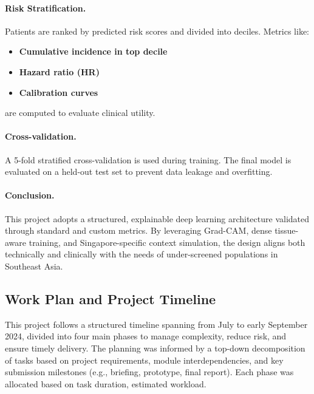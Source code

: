\documentclass[12pt]{article}
\begin{document}
\paragraph{Risk Stratification.}
Patients are ranked by predicted risk scores and divided into deciles. Metrics like:
\begin{itemize}
    \item \textbf{Cumulative incidence in top decile}
    \item \textbf{Hazard ratio (HR)}
    \item \textbf{Calibration curves}
\end{itemize}
are computed to evaluate clinical utility.

\paragraph{Cross-validation.}
A 5-fold stratified cross-validation is used during training. The final model is evaluated on a held-out test set to prevent data leakage and overfitting.

\vspace{1em}

\paragraph{Conclusion.}
This project adopts a structured, explainable deep learning architecture validated through standard and custom metrics. By leveraging Grad-CAM, dense tissue-aware training, and Singapore-specific context simulation, the design aligns both technically and clinically with the needs of under-screened populations in Southeast Asia.

\subsection{Work Plan and Project Timeline}

This project follows a structured timeline spanning from July to early September 2024, divided into four main phases to manage complexity, reduce risk, and ensure timely delivery. The planning was informed by a top-down decomposition of tasks based on project requirements, module interdependencies, and key submission milestones (e.g., briefing, prototype, final report). Each phase was allocated based on task duration, estimated workload.
\end{document}
